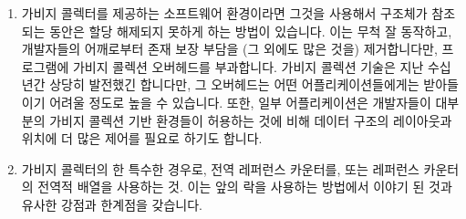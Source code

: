 {\begin{enumerate}
\begin{enumerate}
	\fi

	\item	가비지 콜렉터를 제공하는 소프트웨어 환경이라면 그것을 사용해서
		구조체가 참조되는 동안은 할당 해제되지 못하게 하는 방법이
		있습니다.
		이는 무척 잘 동작하고, 개발자들의 어깨로부터 존재 보장 부담을
		(그 외에도 많은 것을) 제거합니다만, 프로그램에 가비지 콜렉션
		오버헤드를 부과합니다.
		가비지 콜렉션 기술은 지난 수십년간 상당히 발전했긴 합니다만, 그
		오버헤드는 어떤 어플리케이션들에게는 받아들이기 어려울 정도로
		높을 수 있습니다.
		또한, 일부 어플리케이션은 개발자들이 대부분의 가비지 콜렉션
		기반 환경들이 허용하는 것에 비해 데이터 구조의 레이아웃과
		위치에 더 많은 제어를 필요로 하기도 합니다.
	\item	가비지 콜렉터의 한 특수한 경우로, 전역 레퍼런스 카운터를, 또는
		레퍼런스 카운터의 전역적 배열을 사용하는 것.
		이는 앞의 락을 사용하는 방법에서 이야기 된 것과 유사한 강점과
		한계점을 갖습니다.

\end{enumerate}
\end{enumerate}}
